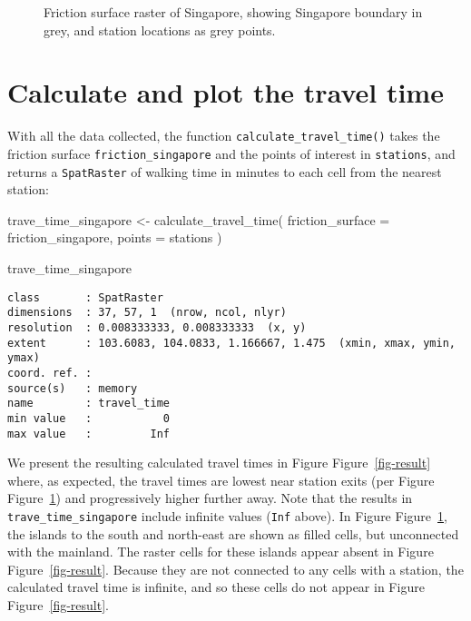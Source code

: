 \documentclass[
  12pt]{article}
\newenvironment{Shaded}{\begin{snugshade}}{\end{snugshade}}
\newcommand{\AttributeTok}[1]{\textcolor[rgb]{0.40,0.45,0.13}{#1}}
\newcommand{\FunctionTok}[1]{\textcolor[rgb]{0.28,0.35,0.67}{#1}}
\newcommand{\NormalTok}[1]{\textcolor[rgb]{0.00,0.23,0.31}{#1}}
\newcommand{\OtherTok}[1]{\textcolor[rgb]{0.00,0.23,0.31}{#1}}
\begin{document}
\begin{figure}


\caption{\label{fig-data}Friction surface raster of Singapore, showing
Singapore boundary in grey, and station locations as grey points.}

\end{figure}%

\section{Calculate and plot the travel
time}\label{calculate-and-plot-the-travel-time}

With all the data collected, the function
\texttt{calculate\_travel\_time()} takes the friction surface
\texttt{friction\_singapore} and the points of interest in
\texttt{stations}, and returns a \texttt{SpatRaster} of walking time in
minutes to each cell from the nearest station:

\begin{Shaded}
\begin{Highlighting}[]
\NormalTok{trave\_time\_singapore }\OtherTok{\textless{}{-}} \FunctionTok{calculate\_travel\_time}\NormalTok{(}
  \AttributeTok{friction\_surface =}\NormalTok{ friction\_singapore,}
  \AttributeTok{points =}\NormalTok{ stations}
\NormalTok{)}

\NormalTok{trave\_time\_singapore}
\end{Highlighting}
\end{Shaded}

\begin{verbatim}
class       : SpatRaster 
dimensions  : 37, 57, 1  (nrow, ncol, nlyr)
resolution  : 0.008333333, 0.008333333  (x, y)
extent      : 103.6083, 104.0833, 1.166667, 1.475  (xmin, xmax, ymin, ymax)
coord. ref. :  
source(s)   : memory
name        : travel_time 
min value   :           0 
max value   :         Inf 
\end{verbatim}

We present the resulting calculated travel times in Figure
Figure~\ref{fig-result} where, as expected, the travel times are lowest
near station exits (per Figure Figure~\ref{fig-data}) and progressively
higher further away. Note that the results in
\texttt{trave\_time\_singapore} include infinite values (\texttt{Inf}
above). In Figure Figure~\ref{fig-data}, the islands to the south and
north-east are shown as filled cells, but unconnected with the mainland.
The raster cells for these islands appear absent in Figure
Figure~\ref{fig-result}. Because they are not connected to any cells
with a station, the calculated travel time is infinite, and so these
cells do not appear in Figure Figure~\ref{fig-result}.
\end{document}

